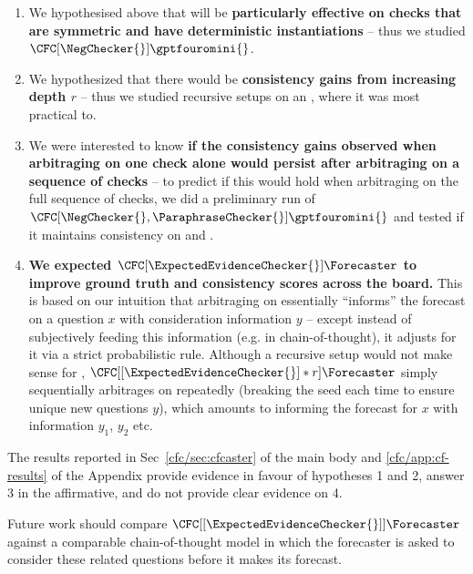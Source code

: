 \begin{enumerate}
    \item We hypothesised above that \CFCaster{} will be \textbf{particularly effective on checks that are symmetric and have deterministic instantiations} -- thus we studied $\CFC[\NegChecker{}]{\gptfouromini{}}$.
    \item We hypothesized that there would be \textbf{consistency gains from increasing depth $r$} -- thus we studied recursive \CFCaster{} setups on \NegChecker{} an \ParaphraseChecker{}, where it was most practical to.
    \item We were interested to know \textbf{if the consistency gains observed when arbitraging on one check alone would persist after arbitraging on a sequence of checks} -- to predict if this would hold when arbitraging on the full sequence of checks, we did a preliminary run of $\CFC[\NegChecker{},\ParaphraseChecker{}]{\gptfouromini{}}$ and tested if it maintains consistency on \NegChecker{} and \ParaphraseChecker{}.
    \item \textbf{We expected $\CFC[\ExpectedEvidenceChecker{}]{\Forecaster}$ to improve ground truth and consistency scores across the board.} This is based on our intuition that arbitraging on \ExpectedEvidenceChecker{} essentially ``informs'' the forecast on a question $x$ with consideration information $y$ -- except instead of subjectively feeding this information (e.g. in chain-of-thought), it adjusts for it via a strict probabilistic rule. Although a recursive setup would not make sense for \ExpectedEvidenceChecker{}, $\CFC[[\ExpectedEvidenceChecker{}]*r]{\Forecaster}$ simply sequentially arbitrages on \ExpectedEvidenceChecker{} repeatedly (breaking the seed each time to ensure unique new questions $y$), which amounts to informing the forecast for $x$ with information $y_1$, $y_2$ etc.
\end{enumerate}

The results reported in Sec~\ref{cfc/sec:cfcaster} of the main body and \ref{cfc/app:cf-results} of the Appendix provide evidence in favour of hypotheses 1 and 2, answer 3 in the affirmative, and do not provide clear evidence on 4.

Future work should compare $\CFC[[\ExpectedEvidenceChecker{}]]{\Forecaster}$ against a comparable chain-of-thought model in which the forecaster is asked to consider these related questions before it makes its forecast.

